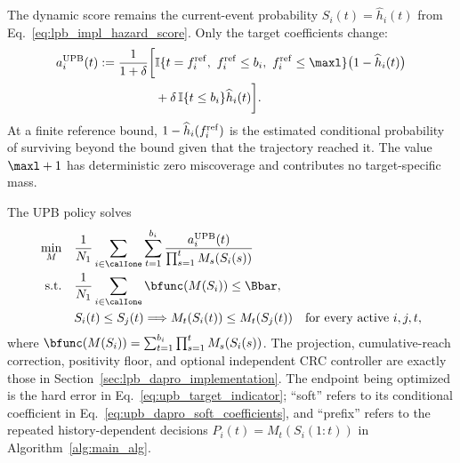 The dynamic score remains the current-event probability
\(S_i(t)=\widehat h_i(t)\) from
Eq.~\eqref{eq:lpb_impl_hazard_score}. Only the target coefficients change:
\begin{equation}
\begin{split}
    a_i^{\rm UPB}(t)
    :=\frac{1}{1+\delta}\biggl[&
      \mathbb I\{t=f_i^{\rm ref},\ f_i^{\rm ref}\leq b_i,\
                       f_i^{\rm ref}\leq\maxl\}
      \bigl(1-\widehat h_i(t)\bigr)\\
      &+\delta\,\mathbb I\{t\leq b_i\}\widehat h_i(t)
    \biggr].
    \label{eq:upb_dapro_soft_coefficients}
\end{split}
\end{equation}
At a finite reference bound, \(1-\widehat h_i(f_i^{\rm ref})\) is the
estimated conditional probability of surviving beyond the bound given that
the trajectory reached it. The value \(\maxl+1\) has deterministic zero
miscoverage and contributes no target-specific mass.

The UPB policy solves
\begin{equation}
\begin{aligned}
    \min_M\quad &
    \frac{1}{N_1}\sum_{i\in\calIone}\sum_{t=1}^{b_i}
    \frac{a_i^{\rm UPB}(t)}{\prod_{s=1}^{t}M_s(S_i(s))}\\
    \text{s.t.}\quad &
    \frac{1}{N_1}\sum_{i\in\calIone}
       \bfunc(M(S_i))\leq\Bbar,\\
    &S_i(t)\leq S_j(t)
      \Longrightarrow M_t(S_i(t))\leq M_t(S_j(t))
      \quad\text{for every active }i,j,t,
    \label{eq:upb_dapro_objective}
\end{aligned}
\end{equation}
where
\(
\bfunc(M(S_i))=\sum_{t=1}^{b_i}\prod_{s=1}^{t}M_s(S_i(s))
\).
The projection, cumulative-reach correction, positivity floor, and optional
independent CRC controller are exactly those in
Section~\ref{sec:lpb_dapro_implementation}. The endpoint being optimized is
the hard error in Eq.~\eqref{eq:upb_target_indicator}; ``soft'' refers to its
conditional coefficient in Eq.~\eqref{eq:upb_dapro_soft_coefficients}, and
``prefix'' refers to the repeated history-dependent decisions
\(P_i(t)=M_t(S_i(1{:}t))\) in Algorithm~\ref{alg:main_alg}.

